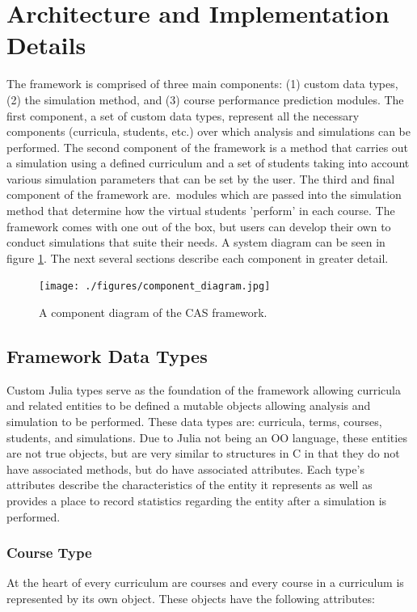 \documentclass[botnum, fleqn]{unmeethesis}
\begin{document}
  \section{Architecture and Implementation Details}
    The framework is comprised of three main components: (1) custom data types, (2) the simulation method, and (3) course performance prediction modules. The first component, a set of custom data types, represent all the necessary components (curricula, students, etc.) over which analysis and simulations can be performed. The second component of the framework is a method that carries out a simulation using a defined curriculum and a set of students taking into account various simulation parameters that can be set by the user. The third and final component of the framework are.\ modules which are passed into the simulation method that determine how the virtual students 'perform' in each course. The framework comes with one out of the box, but users can develop their own to conduct simulations that suite their needs. A system diagram can be seen in figure \ref{fig:component_diagram}. The next several sections describe each component in greater detail.

    \begin{figure}[h!]
      \centerline{\texttt{[image: ./figures/component\_diagram.jpg]}}
      \caption{A component diagram of the CAS framework.} 
      \label{fig:component_diagram}
    \end{figure}

    \subsection{Framework Data Types}
      Custom Julia types serve as the foundation of the framework allowing curricula and related entities to be defined a mutable objects allowing analysis and simulation to be performed. These data types are: curricula, terms, courses, students, and simulations. Due to Julia not being an OO language, these entities are not true objects, but are very similar to structures in C in that they do not have associated methods, but do have associated attributes. Each type's attributes describe the characteristics of the entity it represents as well as provides a place to record statistics regarding the entity after a simulation is performed.

    \subsubsection{Course Type}
      At the heart of every curriculum are courses and every course in a curriculum is represented by its own object. These objects have the following attributes:
\end{document}
